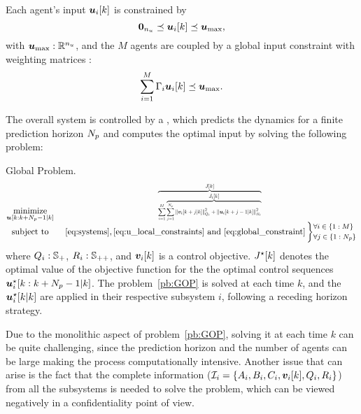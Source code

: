 \documentclass{ifacconf}  %
\begin{document}
Each agent's input $\uik$ is constrained by
\begin{equation}
  \label{eq:u_local_constraints}
  \0_{n_{u}}\preceq\uik\preceq\vec{u}_{\max},
\end{equation}
with ${\boldsymbol{u}_{\mathrm{\max}}:\mathbb{R}^{n_{u}}}$, and
the $M$ agents are coupled by a global input constraint with weighting matrices :
\begin{equation}
  \label{eq:global_constraint}
  \sum^{\nsubsystems}_{i=1}\Gamma_{i}\uik\preceq\umax.
\end{equation}


The overall system is controlled by a \mpc{}, which predicts the dynamics for a finite prediction horizon $N_{p}$ and computes the optimal input by solving the following problem:
\begin{problem}{Global \mpc{} Problem.}\label{pb:GOP}
\begin{equation*}
\begin{matrix}
\underset{\useq}{\mathrm{minimize}}&\resizebox{0.35\textwidth}{!}{$\overbrace{\sum\limits^{M}_{i=1} \overbrace{\sum_{j=1}^{\predhorz} \norm{\mpcvec{v}[i][k+j][k]}^{2}_{Q_i}+\norm{\mpcvec{u}[i][k+j-1][k]}^{2}_{R_i}}^{\textstyle{} \obji}}^{\textstyle{} \globobj}$}\\
\mathrm{subject~ to}&~\eqref{eq:systems},\eqref{eq:u_local_constraints}\ \mathrm{and}\ \eqref{eq:global_constraint}
\left\}\small
\begin{aligned}
  &\forall i\in \{1:\nsubsystems\}\\
  &\forall j\in \{1:\predhorz\}
\end{aligned}\right.

\end{matrix}
\end{equation*}
where ${Q_{i}:\mathbb{S}_{+}}$, ${R_{i}:\mathbb{S}_{++}}$, and $\vik$ is a control objective.
$\optglobobj$ denotes the optimal value of the objective function for the the optimal control sequences ${\optuiseq}$.
The problem~\ref{pb:GOP} is solved at each time $k$, and the ${\optuikk}$ are applied in their respective subsystem $i$, following a receding horizon strategy.
\end{problem}

Due to the monolithic aspect of problem~\ref{pb:GOP}, solving it at each time $k$ can be quite challenging, since the prediction horizon and the number of agents can be large making the process computationally intensive. Another issue that can arise is the fact that the complete information (${\mathcal{I}_{i}=\{A_{i},B_{i},C_{i},\boldsymbol{v}_{i}[k],Q_{i},R_{i}\}}$) from all the subsystems is needed to solve the problem,
which can be viewed negatively in a confidentiality point of view.
\end{document}
